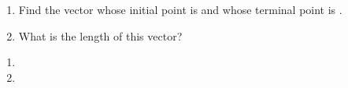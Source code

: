 
\begin{ELexample}{}

\begin{enumerate}
\def\labelenumi{(\alph{enumi})}
\item
  Find the vector whose initial point is  and whose terminal point is .
\item
  What is the length of this vector?
\end{enumerate}

\begin{ELsolution}


\begin{enumerate}
\def\labelenumi{(\alph{enumi})}
\tightlist
\item
\item
\end{enumerate}

\end{ELsolution}

\end{ELexample}


